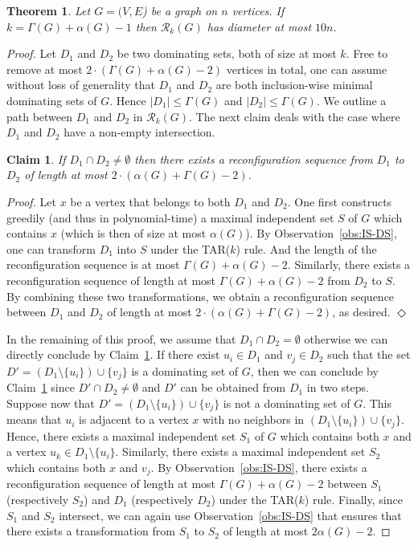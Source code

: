 \documentclass[10pt]{article}
\newtheorem{theorem}{Theorem}
\newtheorem{claim}{Claim}
\newenvironment{proofclaim}[1][]%
    {\noindent \emph{Proof.} {}{#1}{}}{\hfill
    $\Diamond$\vspace{1em}}
\begin{document}
\begin{theorem} \label{thm:upper-bound}
Let $G=(V,E$) be a graph on $n$ vertices. If $k  = \Gamma(G) + \alpha(G) - 1$ then $\mathcal{R}_k(G)$ has diameter at most $10n$.
\end{theorem}

\begin{proof}
Let $D_1$ and $D_2$ be two dominating sets, both of size at most $k$. Free to remove at most $2\cdot (\Gamma(G) + \alpha(G) - 2)$ vertices in total, one can assume without loss of generality that $D_1$ and $D_2$ are both inclusion-wise minimal dominating sets of $G$. Hence $|D_1| \le \Gamma(G)$ and $|D_2| \le \Gamma(G)$. We outline a path between $D_1$ and $D_2$ in $\mathcal{R}_k(G)$. The next claim deals with the case where $D_1$ and $D_2$ have a non-empty intersection.

\begin{claim}\label{claim:non-empty-intersection}
If $D_1 \cap D_2 \neq \emptyset$ then there exists a reconfiguration sequence from $D_1$ to $D_2$ of length at most $2 \cdot (\alpha(G)+\Gamma(G)-2)$.
\end{claim}

\begin{proofclaim}
Let $x$ be a vertex that belongs to both $D_1$ and $D_2$. One first constructs greedily (and thus in polynomial-time) a maximal independent set $S$ of $G$ which contains $x$ (which is then of size at most $\alpha(G)$). By Observation~\ref{obs:IS-DS}, one can transform $D_1$ into $S$ under the {\sf TAR}($k$) rule. And the length of the reconfiguration sequence is at most $\Gamma(G)+\alpha(G)-2$.
Similarly, there exists a reconfiguration sequence of length at most $\Gamma(G)+\alpha(G)-2$ from $D_2$ to $S$. By combining these two transformations, we obtain a reconfiguration sequence between $D_1$ and $D_2$ of length at most $2 \cdot (\alpha(G)+\Gamma(G)-2)$, as desired.
\end{proofclaim}

In the remaining of this proof, we assume that $D_1 \cap D_2 = \emptyset$ otherwise we can directly conclude by Claim~\ref{claim:non-empty-intersection}. If there exist $u_i \in D_1$ and $v_j \in D_2$ such that the set $D' = (D_1 \setminus \{u_i\}) \cup \{v_j\}$ is a dominating set of $G$, then we can conclude by Claim~\ref{claim:non-empty-intersection} since $D' \cap D_2 \neq \emptyset$ and $D'$ can be obtained from $D_1$ in two steps. Suppose now that $D' = (D_1 \setminus \{u_i\}) \cup \{v_j\}$ is not a dominating set of $G$. This means that $u_i$ is adjacent to a vertex $x$ with no neighbors in $(D_1 \setminus \{u_i\}) \cup \{v_j\}$. Hence, there exists a maximal independent set $S_1$ of $G$ which contains both $x$ and a vertex $u_k \in D_1 \setminus \{u_i\}$. Similarly, there exists a maximal independent set $S_2$ which contains both $x$ and $v_j$. By Observation~\ref{obs:IS-DS}, there exists a reconfiguration sequence of length at most $\Gamma(G)+\alpha(G)-2$ between $S_1$ (respectively $S_2$) and $D_1$ (respectively $D_2$) under the {\sf TAR}($k$) rule. 
Finally, since $S_1$ and $S_2$ intersect, we can again use Observation~\ref{obs:IS-DS} that ensures that there exists a transformation from $S_1$ to $S_2$ of length at most $2\alpha(G)-2$.


\end{proof}
\end{document}
